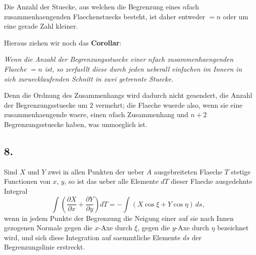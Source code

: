 \documentclass[12pt,a4paper]{book}
\theoremstyle{definition}
\theoremstyle{remark}
\begin{document}
Die Anzahl der Stuecke, aus welchen die Begrenzung eines $n$fach zusammenhaengenden Flaechenstuecks besteht, ist daher entweder $= n$ oder um eine gerade Zahl kleiner.

Hieraus ziehen wir noch das \textbf{Corollar}:

\emph{Wenn die Anzahl der Begrenzungsstuecke einer $n$fach zusammenhaengenden Flaeche $= n$ ist, so zerfaellt diese durch jeden ueberall einfachen im Innern in sich zuruecklaufenden Schnitt in zwei getrennte Stuecke.}

Denn die Ordnung des Zusammenhangs wird dadurch nicht geaendert, die Anzahl der Begrenzungsstuecke um $2$ vermehrt; die Flaeche wuerde also, wenn sie eine zusammenhaengende waere, einen $n$fach Zusammenhang und $n + 2$ Begrenzungsstuecke haben, was unmoeglich ist.

\subsection*{8.}

Sind $X$ und $Y$ zwei in allen Punkten der ueber $A$ ausgebreiteten Flaeche $T$ stetige Functionen von $x$, $y$, so ist das ueber alle Elemente $dT$ dieser Flaeche ausgedehnte Integral
\begin{equation}
\int \left(\frac{\partial X}{\partial x} + \frac{\partial Y}{\partial y}\right) dT = -\int (X \cos\xi + Y \cos\eta) \, ds,
\end{equation}
wenn in jedem Punkte der Begrenzung die Neigung einer auf sie nach Innen gezogenen Normale gegen die $x$-Axe durch $\xi$, gegen die $y$-Axe durch $\eta$ bezeichnet wird, und sich diese Integration auf saemmtliche Elemente $ds$ der Begrenzungslinie erstreckt.
\end{document}
